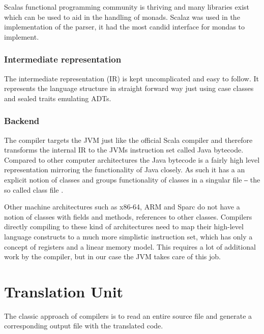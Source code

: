 \documentclass{VUMIFPSbakalaurinis}
\begin{document}
Scalas functional programming community is thriving and many libraries exist which can be used to aid in the handling of monads.
Scalaz \cite{scalaz} was used in the implementation of the parser, it had the most candid interface for mondas to implement.


\subsubsection{Intermediate representation}

The intermediate representation (IR) is kept uncomplicated and easy to follow.
It represents the language structure in straight forward way just using case classes and sealed traits emulating ADTs.



\subsubsection{Backend}

The compiler targets the JVM just like the official Scala compiler and therefore transforms the internal IR to the JVMs instruction set called Java bytecode.
Compared to other computer architectures the Java bytecode is a fairly high level representation mirroring the functionality of Java closely.
As such it has a an explicit notion of classes and groups functionality of classes in a singular file ‒ the so called class file \cite{ClassFileFormat}.

Other machine architectures such as x86-64, ARM and Sparc do not have a notion of classes with fields and methods, references to other classes.
Compilers directly compiling to these kind of architectures need to map their high-level language constructs to a much more simplistic instruction set, which has only a concept of registers and a linear memory model.
This requires a lot of additional work by the compiler, but in our case the JVM takes care of this job.

\section{Translation Unit}
The classic approach of compilers is to read an entire source file and generate a corresponding output file with the translated code.
\end{document}
